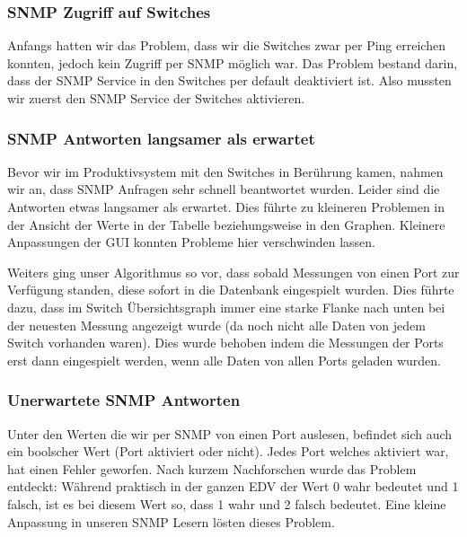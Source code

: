 \subsubsection*{SNMP Zugriff auf Switches}
Anfangs hatten wir das Problem, dass wir die Switches zwar per Ping erreichen konnten, jedoch kein Zugriff per SNMP möglich war. Das Problem bestand darin, dass der SNMP Service in den Switches per default deaktiviert ist. Also mussten wir zuerst den SNMP Service der Switches aktivieren.

\subsubsection*{SNMP Antworten langsamer als erwartet}
Bevor wir im Produktivsystem mit den Switches in Berührung kamen, nahmen wir an, dass SNMP Anfragen sehr schnell beantwortet wurden. Leider sind die Antworten etwas langsamer als erwartet. Dies führte zu kleineren Problemen in der Ansicht der Werte in der Tabelle beziehungsweise in den Graphen. Kleinere Anpassungen der GUI konnten Probleme hier verschwinden lassen.

Weiters ging unser Algorithmus so vor, dass sobald Messungen von einen Port zur Verfügung standen, diese sofort in die Datenbank eingespielt wurden. Dies führte dazu, dass im Switch Übersichtsgraph immer eine starke Flanke nach unten bei der neuesten Messung angezeigt wurde (da noch nicht alle Daten von jedem Switch vorhanden waren). Dies wurde behoben indem die Messungen der Ports erst dann eingespielt werden, wenn alle Daten von allen Ports geladen wurden.

\subsubsection*{Unerwartete SNMP Antworten}
Unter den Werten die wir per SNMP von einen Port auslesen, befindet sich auch ein boolscher Wert (Port aktiviert oder nicht). Jedes Port welches aktiviert war, hat einen Fehler geworfen. Nach kurzem Nachforschen wurde das Problem entdeckt: Während praktisch in der ganzen EDV der Wert 0 wahr bedeutet und 1 falsch, ist es bei diesem Wert so, dass 1 wahr und 2 falsch bedeutet. Eine kleine Anpassung in unseren SNMP Lesern lösten dieses Problem.

